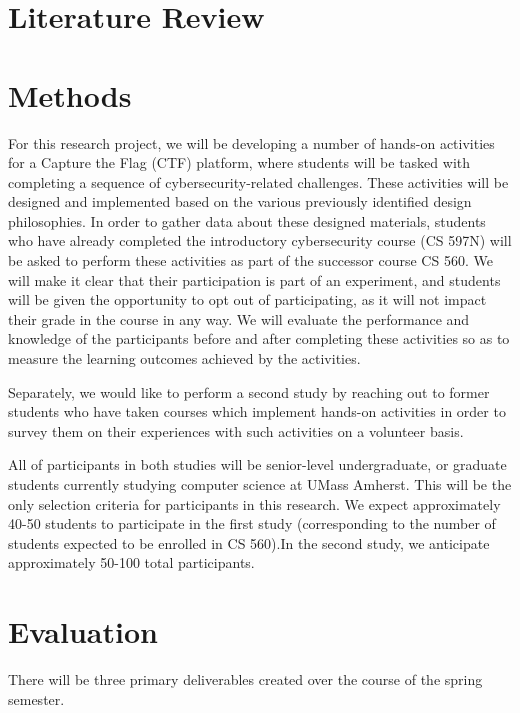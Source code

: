 \documentclass{article}
\begin{document}
\section{Literature Review}

        

\section{Methods}

    For this research project, we will be developing a number of hands-on activities for a Capture the Flag (CTF) platform, where students will be tasked with completing a sequence of cybersecurity-related challenges. %
These activities will be designed and implemented based on the various previously identified design philosophies. %
In order to gather data about these designed materials, students who have already completed the introductory cybersecurity course (CS 597N) will be asked to perform these activities as part of the successor course CS 560. %
We will make it clear that their participation is part of an experiment, and students will be given the opportunity to opt out of participating, as it will not impact their grade in the course in any way. %
We will evaluate the performance and knowledge of the participants before and after completing these activities so as to measure the learning outcomes achieved by the activities. 

    Separately, we would like to perform a second study by reaching out to former students who have taken courses which implement hands-on activities in order to survey them on their experiences with such activities on a volunteer basis. 

    All of participants in both studies will be senior-level undergraduate, or graduate students currently studying computer science at UMass Amherst. %
This will be the only selection criteria for participants in this research. %
We expect approximately 40-50 students to participate in the first study (corresponding to the number of students expected to be enrolled in CS 560).In the second study, we anticipate approximately 50-100 total participants. 

\section{Evaluation}

    There will be three primary deliverables created over the course of the spring semester.
\end{document}
